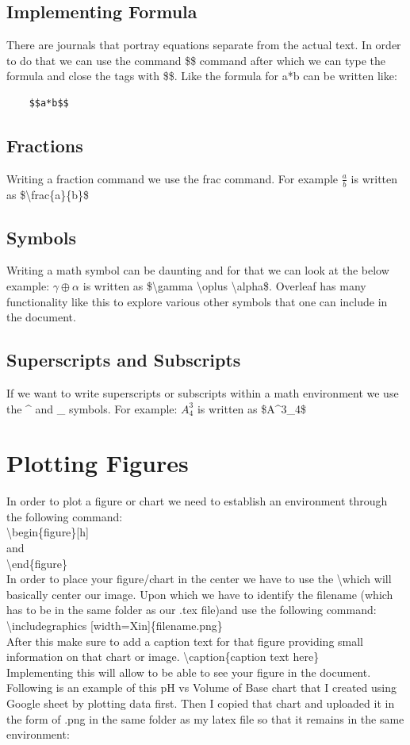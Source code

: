 \documentclass[12pt,journal,compsoc]{IEEEtran}
\begin{document}
\subsection{Implementing Formula}
There are journals that portray equations separate from the actual text. In order to do that we can use the command \$\$ command after which we can type the formula and close the tags with \$\$. 
Like the formula for a*b can be written like:
\begin{verbatim}
    $$a*b$$
\end{verbatim}

\subsection{Fractions}
Writing a fraction command we use the frac command. For example $\frac{a}{b}$ is written as \$\textbackslash frac\{a\}\{b\}\$

\subsection{Symbols}
Writing a math symbol can be daunting and for that we can look at the below example: $\gamma \oplus \alpha$ is written as \$\textbackslash gamma \textbackslash oplus \textbackslash alpha\$. Overleaf has many functionality like this to explore various other symbols that one can include in the document.


\subsection{Superscripts and Subscripts}
If we want to write superscripts or subscripts within a math environment we use the \^{} and \_ symbols. For example: $A^3_4$ is written as \$A\^{}3\_4\$


\section{Plotting Figures}
In order to plot a figure or chart we need to establish an environment through the following command:
\\ \textbackslash begin\{figure\}{[}h{]} 
\\ and 
\\ \textbackslash end\{figure\} 
\\ In order to place your figure/chart in the center we have to use the \textbackslash which will basically center our image. Upon which we have to identify the filename (which has to be in the same folder as our .tex file)and use the following command:
\\ \textbackslash includegraphics {[}width=Xin{]}\{filename.png\} 
\\ After this make sure to add a caption text for that figure providing small information on that chart or image. \textbackslash caption\{caption text here\} 
\\ Implementing this will allow to be able to see your figure in the document. Following is an example of this pH vs Volume of Base chart that I created using Google sheet by plotting data first. Then I copied that chart and uploaded it in the form of .png in the same folder as my latex file so that it remains in the same environment:
\end{document}
